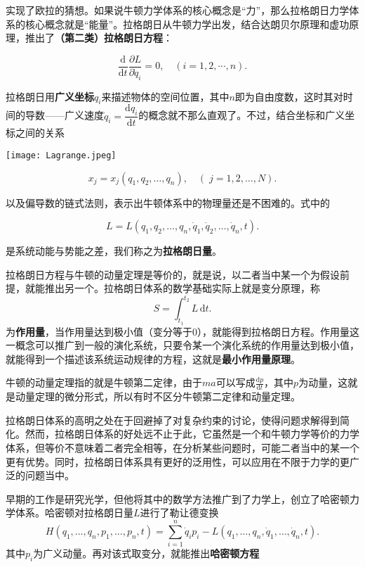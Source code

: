 实现了欧拉的猜想。如果说牛顿力学体系的核心概念是“力”，那么拉格朗日力学体系的核心概念就是“能量”。拉格朗日从牛顿力学出发，结合达朗贝尔原理和虚功原理，推出了\textbf{（第二类）拉格朗日方程}：

\[
    \frac{\mathrm{d}}{\mathrm{d}t}\frac{\partial L}{\partial \dot{q}_i}=0, \quad (i=1,2,\cdots,n)
    .\]

拉格朗日用\textbf{广义坐标}$q_i$来描述物体的空间位置，其中$n$即为自由度数，这时其对时间的导数——广义速度$\dot{q}_i=\dfrac{\mathrm{d} q_i}{\mathrm{d} t}$的概念就不那么直观了。不过，结合坐标和广义坐标之间的关系

\begin{marginparfigure}
    \texttt{[image: Lagrange.jpeg]}
\end{marginparfigure}

\[
    x_j=x_j\left(q_1, q_2, \dots, q_n\right), \quad \left(\;\!j=1, 2, \dots, N\right)
    .\]

以及偏导数的链式法则，表示出牛顿体系中的物理量还是不困难的。式中的

\[
    L=L(q_1,q_2,\dots,q_n,\dot{q}_1,\dot{q}_2,\dots,\dot{q}_n,t)
    .\]

是系统动能与势能之差，我们称之为\textbf{拉格朗日量}。

拉格朗日方程与牛顿的动量定理是等价的，就是说，以二者当中某一个为假设前提，就能推出另一个。拉格朗日体系的数学基础实际上就是变分原理，称
\[
    S=\int_{t_1}^{t_2}{L\,\mathrm{d}t}
    .\]
为\textbf{作用量}，当作用量达到极小值（变分等于$0$），就能得到拉格朗日方程。作用量这一概念可以推广到一般的演化系统，只要令某一个演化系统的作用量达到极小值，就能得到一个描述该系统运动规律的方程，这就是\textbf{最小作用量原理}。
\begin{marginpartext}
        牛顿的动量定理指的就是牛顿第二定律，由于$ma$可以写成$\frac{\mathrm{d}p}{\mathrm{d}t}$，其中$p$为动量，这就是动量定理的微分形式，所以有时不区分牛顿第二定律和动量定理。
\end{marginpartext}

拉格朗日体系的高明之处在于回避掉了对复杂约束的讨论，使得问题求解得到简化。然而，拉格朗日体系的好处远不止于此，它虽然是一个和牛顿力学等价的力学体系，但等价不意味着二者完全相等，在分析某些问题时，可能二者当中的某一个更有优势。同时，拉格朗日体系具有更好的泛用性，可以应用在不限于力学的更广泛的问题当中。

早期的工作是研究光学，但他将其中的数学方法推广到了力学上，创立了哈密顿力学体系。哈密顿对拉格朗日量$L$进行了勒让德变换
\[
    H\left(q_1,\dots,q_n,p_1,\dots,p_n,t\right)=\sum_{i=1}^n{\dot{q}_ip_i}-L\left( q_1,\dots ,q_n,\dot{q}_1,\dots ,\dot{q}_n,t \right)
    .\]
其中$p_i$为广义动量。再对该式取变分，就能推出\textbf{哈密顿方程}

